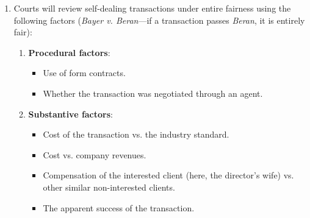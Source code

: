 \begin{enumerate}
\begin{enumerate}
\begin{enumerate}
            \begin{enumerate}
                \item Approval by a \textbf{majority of disinterested 
                directors}. \emph{Benihana}. %
                \item Approval by \textbf{shareholders}.\footnote{Must the 
                shareholders be disinterested? DGCL 144(a) requires \emph{all} 
                shareholders, but the \emph{Fliegler} court (in DE) required 
                only \emph{disinterested} shareholders. MBCA \S\ 8.60 ff. also 
                requires disinterested shareholders.}
                \item \textbf{Entire fairness}. \emph{Bayer v. Beran}, below.
                \item (Approving directors or shareholders must be 
                \textbf{fully informed}.)
            \end{enumerate}
            \item Courts will review self-dealing transactions under entire 
            fairness using the following factors (\emph{Bayer v. Beran}---if a 
            transaction passes \emph{Beran}, it is entirely fair): %
            \begin{enumerate}
                \item \textbf{Procedural factors}:
                \begin{itemize}
                    \item Use of form contracts.
                    \item Whether the transaction was negotiated through an agent.
                \end{itemize}
                \item \textbf{Substantive factors}:
                \begin{itemize}
                    \item Cost of the transaction vs. the industry standard.
                    \item Cost vs. company revenues.
                    \item Compensation of the interested client (here, the 
                    director's wife) vs. other similar non-interested clients.
                    \item The apparent success of the transaction.
                \end{itemize}
            \end{enumerate}
        \end{enumerate}

\end{enumerate}
\end{enumerate}
